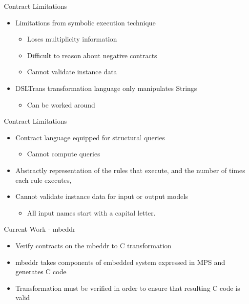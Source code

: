 \documentclass[xcolor=dvipsnames, 12pt, handout]{beamer}
\begin{document}
\begin{frame}{Contract Limitations}

\begin{itemize}
\item Limitations from symbolic execution technique
\begin{itemize}
\item Loses multiplicity information
\item Difficult to reason about negative contracts
\item Cannot validate instance data
\end{itemize}
\item DSLTrans transformation language only manipulates Strings
\begin{itemize}
\item Can be worked around
\end{itemize}
\end{itemize}
\end{frame}

\begin{frame}{Contract Limitations}

\begin{itemize}
\item Contract language equipped for structural queries
\begin{itemize}
\item Cannot compute queries
\end{itemize}
\item Abstractly representation of the rules that
execute, and the number of times each rule executes,
\item Cannot validate instance data for input or output models
\begin{itemize}
\item All input names start with a capital
letter.
\end{itemize}
\end{itemize}
\end{frame}


\begin{frame}{Current Work - mbeddr}

\begin{itemize}[<+->]
\item Verify contracts on the mbeddr  to C transformation
\item mbeddr takes components of embedded system expressed in MPS and generates C code
\item Transformation must be verified in order to ensure that resulting C code is valid
\end{itemize}
\end{frame}
\end{document}
